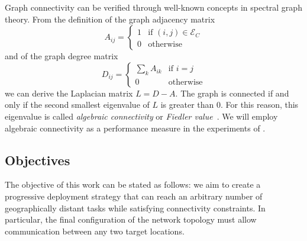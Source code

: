 Graph connectivity can be verified through well-known concepts in
spectral graph theory. From the definition of the graph adjacency
matrix
$$
A_{ij} =
\begin{cases}
  1 & \text{if }(i,j) \in \mathcal{E}_C \\
  0 & \text{otherwise}
\end{cases}
$$
and of the graph degree matrix
$$
D_{ij} =
\begin{cases}
  \sum_k A_{ik} & \text{if }i = j\\
  0             & \text{otherwise}
\end{cases}
$$
we can derive the Laplacian matrix $L = D - A.$ The graph is connected
if and only if the second smallest eigenvalue of $L$ is greater than
0. For this reason, this eigenvalue is called \emph{algebraic
  connectivity} or \emph{Fiedler value}~\cite{Fiedler1973}. We will
employ algebraic connectivity as a performance measure in the
experiments of .

\subsection{Objectives}
\label{sec:objectives}

The objective of this work can be stated as follows: we aim to create
a progressive deployment strategy that can reach an arbitrary number
of geographically distant tasks while satisfying connectivity
constraints. In particular, the final configuration of the network
topology must allow communication between any two target locations.

